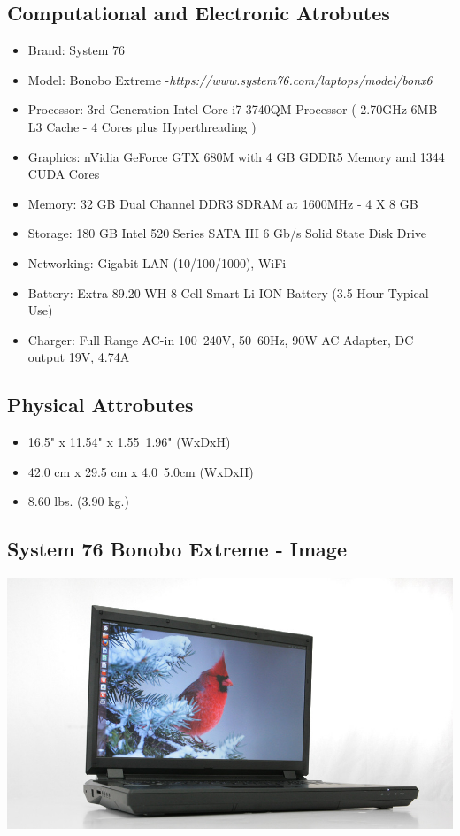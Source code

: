 \documentclass{article}
\begin{document}
\subsection{Computational and Electronic Atrobutes}
\begin{itemize}
\item Brand: System 76
\item Model: Bonobo Extreme -\textit{https://www.system76.com/laptops/model/bonx6}
\item Processor: 3rd Generation Intel Core i7-3740QM Processor ( 2.70GHz 6MB L3 Cache - 4 Cores plus Hyperthreading ) 
\item Graphics: nVidia GeForce GTX 680M with 4 GB GDDR5 Memory and 1344 CUDA Cores
\item Memory: 32 GB Dual Channel DDR3 SDRAM at 1600MHz - 4 X 8 GB
\item Storage: 180 GB Intel 520 Series SATA III 6 Gb/s Solid State Disk Drive
\item Networking: Gigabit LAN (10/100/1000), WiFi
\item Battery: Extra 89.20 WH 8 Cell Smart Li-ION Battery (3.5 Hour Typical Use)
\item Charger: Full Range AC-in 100~240V, 50~60Hz, 90W AC Adapter, DC output 19V, 4.74A
\end{itemize}

\subsection{Physical Attrobutes}
\begin{itemize}
\item 16.5" x 11.54" x 1.55~1.96" (WxDxH)
\item 42.0 cm x 29.5 cm x 4.0~5.0cm (WxDxH)
\item 8.60 lbs. (3.90 kg.)
\end{itemize}

\subsection{System 76 Bonobo Extreme - Image}
\begin{center}
\includegraphics[width=0.75\columnwidth]{./pix/system76.jpg}
\end{center}
\end{document}
